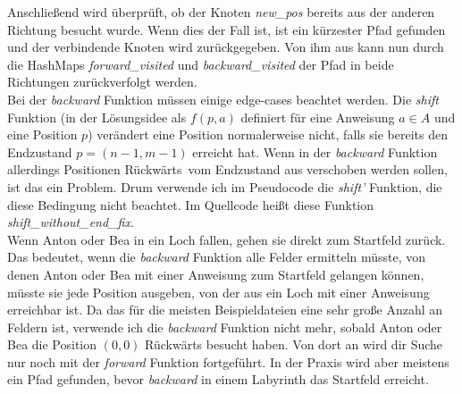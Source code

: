 \documentclass[a4paper,10pt,ngerman]{scrartcl}
\begin{document}
    Anschließend wird überprüft, ob der Knoten \textit{new\_pos} bereits aus der anderen Richtung besucht wurde. Wenn dies der Fall ist, ist ein kürzester Pfad gefunden und der verbindende Knoten wird zurückgegeben. Von ihm aus kann nun durch die HashMaps \textit{forward\_visited} und \textit{backward\_visited} der Pfad in beide Richtungen zurückverfolgt werden. \\
    Bei der \textit{backward} Funktion müssen einige edge-cases beachtet werden. Die \textit{shift} Funktion (in der Lösungsidee als $f(p,a)$ definiert für eine Anweisung $a \in A$ und eine Position $p$) verändert eine Position normalerweise nicht, falls sie bereits den Endzustand $p = (n-1, m-1)$ erreicht hat. Wenn in der \textit{backward} Funktion allerdings Positionen \glqq Rückwärts\grqq~vom Endzustand aus verschoben werden sollen, ist das ein Problem. Drum verwende ich im Pseudocode die \textit{shift'} Funktion, die diese Bedingung nicht beachtet. Im Quellcode heißt diese Funktion \textit{shift\_without\_end\_fix}. \\
    Wenn Anton oder Bea in ein Loch fallen, gehen sie direkt zum Startfeld zurück. Das bedeutet, wenn die \textit{backward} Funktion alle Felder ermitteln müsste, von denen Anton oder Bea mit einer Anweisung zum Startfeld gelangen können, müsste sie jede Position ausgeben, von der aus ein Loch mit einer Anweisung erreichbar ist. Da das für die meisten Beispieldateien eine sehr große Anzahl an Feldern ist, verwende ich die \textit{backward} Funktion nicht mehr, sobald Anton oder Bea die Position $(0,0)$ Rückwärts besucht haben. Von dort an wird dir Suche nur noch mit der \textit{forward} Funktion fortgeführt. In der Praxis wird aber meistens ein Pfad gefunden, bevor \textit{backward} in einem Labyrinth das Startfeld erreicht. \\
\end{document}
